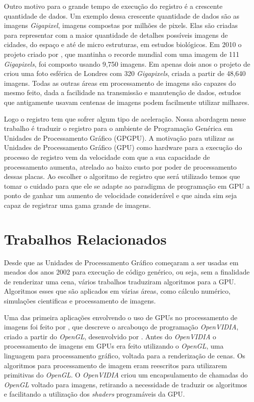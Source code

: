 	Outro motivo para o grande tempo de execução do registro é a crescente quantidade de dados. Um exemplo dessa crescente
quantidade de dados são as imagens \textit{Gigapixel}, imagens compostas por milhões de pixels. Elas são criadas para 
representar com a maior quantidade de detalhes possíveis imagens de cidades, do espaço e até de micro estruturas, em 
estudos biológicos. Em 2010 o projeto criado por \cite{sevilla111}, que mantinha o recorde mundial com uma imagem de 111 
\textit{Gigapixels}, foi composto usando 9,750 imagens. Em apenas dois anos o projeto de \cite{london320} criou uma foto
esférica de Londres com 320 \textit{Gigapixels}, criada a partir de 48,640 imagens. Todas as outras áreas em processamento
de imagens são capazes do mesmo feito, dada a facilidade na transmissão e manutenção de dados, estudos que antigamente
usavam centenas de imagens podem facilmente utilizar milhares.

	Logo o registro tem que sofrer algum tipo de aceleração. Nossa abordagem nesse trabalho é traduzir o registro para o 
ambiente de Programação Genérica em Unidades de Processamento Gráfico (GPGPU). A motivação para utilizar as Unidades de 
Processamento Gráfico (GPU) como hardware para a execução do processo de registro vem da velocidade com que a sua 
capacidade de processamento aumenta, atrelado ao baixo custo por poder de processamento dessas placas. Ao escolher o 
algoritmo de registro que será utilizado temos que tomar o cuidado para que ele se adapte ao paradigma de programação em 
GPU a ponto de ganhar um aumento de velocidade considerável e que ainda sim seja capaz de registrar uma gama grande de 
imagens.

\section{Trabalhos Relacionados}
\label{sec:objetivo}
	Desde que as Unidades de Processamento Gráfico começaram a ser usadas em meados dos anos 2002 para execução de 
código genérico, ou seja, sem a finalidade de renderizar uma cena, vários trabalhos traduziram algoritmos para a GPU.
Algoritmos esses que são aplicados em várias áreas, como cálculo numérico, simulações cientificas e processamento de 
imagens.

	Uma das primeira aplicações envolvendo o uso de GPUs no processamento de imagens foi feito por 
\cite{fung2005openvidia}, que descreve o arcabouço de programação \textit{OpenVIDIA}, criado a partir do 
\textit{OpenGL}, desenvolvido por \cite{opengl}. Antes do \textit{OpenVIDIA} o processamento de imagens em GPUs era
feito utilizando o \textit{OpenGL}, uma linguagem para processamento gráfico, voltada para a renderização de cenas. Os
algoritmos para processamento de imagem eram reescritos para utilizarem primitivas do \textit{OpenGL}. O 
\textit{OpenVIDIA} criou um encapsulamento de chamadas do \textit{OpenGL} voltado para imagens, retirando a necessidade
de traduzir os algoritmos e facilitando a utilização dos \textit{shaders} programáveis da GPU.

